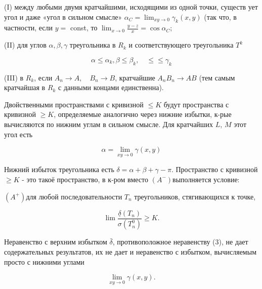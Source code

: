 \documentclass[10pt]{article}
\begin{document}
(I) между любыми двумя кратчайшими, исходящими из одной точки, существ ует угол и даже «угол в сильном смысле» $\alpha_{C}=\lim _{x y \rightarrow 0} \gamma_{k}(x, y)$ (так что, в частности, если $y=$ const, то $\lim _{x \rightarrow 0} \frac{y-z}{x}=\cos \alpha_{C}$;



(II) для углов $\alpha, \beta, \gamma$ треугольника в $R_{k}$ и соответствующего треугольника $T^{k}$



\[

\alpha \leqslant \alpha_{k}, \beta \leqslant \beta_{k}, \quad \leqslant \leqslant \gamma_{k}

\]



(III) в $R_{k}$, если $A_{n} \rightarrow A, \quad B_{n} \rightarrow B$, кратчайшие $A_{n} B_{n} \rightarrow A B$ (тем самым кратчайшая в $R_{k}$ с данными концами единственна).



Двойственными пространствами с кривизной $\leqslant K$ будут пространства с кривизной $\geqslant K$, определяемые аналогично через нижние избытки, к-рые вычисляются по нижним углам в сильном смысле. Для кратчайших $L$, $M$ этот угол есть



\[

\alpha=\lim _{x y \rightarrow 0} \gamma(x, y)

\]



Нижний избыток треугольника есть $\delta=\alpha+\beta+\gamma-\pi$. Пространство с кривизной $\geqslant K$ - это такоё пространство, в к-ром вместо $\left(A^{-}\right)$выполняется условие:



$\left(A^{+}\right)$для любой последовательности $T_{n}$ треугольников, стягивающихся к точке,



\[

\lim \frac{\underline{\delta}\left(T_{n}\right)}{\sigma\left(T_{n}^{0}\right)} \geqslant K .

\]



Неравенство с верхним избытком $\bar{\delta}$, противоположное неравенству (3), не дает содержательных результатов, их не дает и неравенство с избытком, вычисляемым просто с нижними углами



\[

\lim _{x y \rightarrow 0} \gamma(x, y) .

\]
\end{document}
